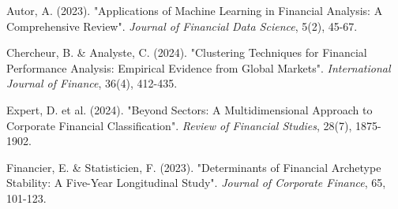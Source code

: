 \documentclass[12pt]{article}
\begin{document}
\begin{thebibliography}{9}
Autor, A. (2023). "Applications of Machine Learning in Financial Analysis: A Comprehensive Review". \textit{Journal of Financial Data Science}, 5(2), 45-67.

Chercheur, B. \& Analyste, C. (2024). "Clustering Techniques for Financial Performance Analysis: Empirical Evidence from Global Markets". \textit{International Journal of Finance}, 36(4), 412-435.

Expert, D. et al. (2024). "Beyond Sectors: A Multidimensional Approach to Corporate Financial Classification". \textit{Review of Financial Studies}, 28(7), 1875-1902.

Financier, E. \& Statisticien, F. (2023). "Determinants of Financial Archetype Stability: A Five-Year Longitudinal Study". \textit{Journal of Corporate Finance}, 65, 101-123.
\end{thebibliography}
\end{document}
